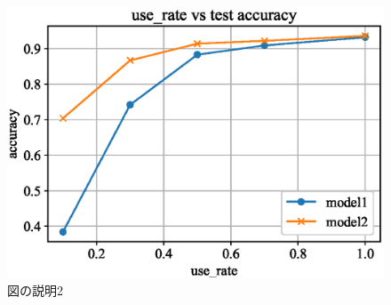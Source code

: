 \documentclass[twocolumn,10pt]{jarticle}
\begin{document}
\begin{figure}[htbp]
  \centering
  \includegraphics[width=.9\linewidth]{fig/graph2.eps}
  \caption{図の説明2}
\label{fig:graph2}
\end{figure}







\end{document}

